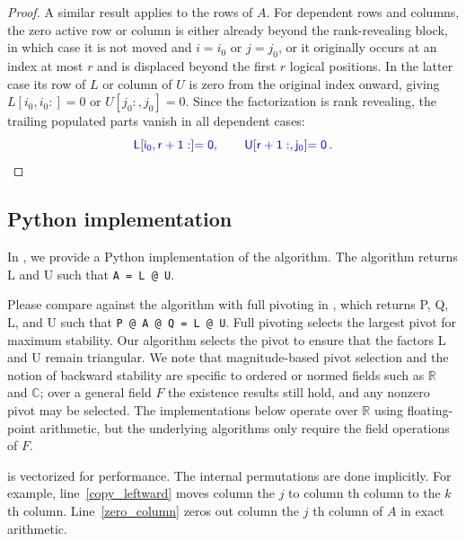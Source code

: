 \documentclass[10pt,twoside]{siamart1116}
\numberwithin{theorem}{section}
\providecommand{\DIFadd}[1]{{\protect\color{blue} \sf #1}} %
\providecommand{\DIFdel}[1]{{\protect\color{red} \scriptsize #1}} %
\providecommand{\DIFaddbegin}{} %
\providecommand{\DIFaddend}{} %
\providecommand{\DIFdelbegin}{} %
\providecommand{\DIFdelend}{} %
\begin{document}
\begin{proof}
  \DIFdelbegin \DIFdel{A similar result applies to the rows of $A$. }\DIFdelend \DIFaddbegin \DIFadd{For dependent rows and columns, the zero active row or column is either already beyond the rank-revealing block, in which case it is not moved and $i=i_0$ or $j=j_0$, or it originally occurs at an index at most $r$ and is displaced beyond the first $r$ logical positions. In the latter case its row of $L$ or column of $U$ is zero from the original index onward, giving $L[i_0,i_0:]=0$ or $U[j_0:,j_0]=0$. Since the factorization is rank revealing, the trailing populated parts vanish in all dependent cases:
  }\[
    \DIFadd{L}[\DIFadd{i_0,r+1:}] \DIFadd{= 0, \qquad U}[\DIFadd{r+1:,j_0}] \DIFadd{= 0 \,.
  }\]
\DIFaddend \end{proof}

\subsection{Python implementation}

In , we provide a Python implementation of the algorithm. The algorithm returns L and U such that \verb|A = L @ U|.

Please compare against the algorithm with full pivoting in , which returns P, Q, L, and U such that \verb|P @ A @ Q = L @ U|. Full pivoting selects the largest pivot for maximum stability. Our algorithm selects the pivot to ensure that the factors L and U remain triangular. \DIFaddbegin \DIFadd{We note that magnitude-based pivot selection and the notion of backward stability are specific to ordered or normed fields such as $\mathbb{R}$ and $\mathbb{C}$; over a general field $F$ the existence results still hold, and any nonzero pivot may be selected. The implementations below operate over $\mathbb{R}$ using floating-point arithmetic, but the underlying algorithms only require the field operations of $F$.
}\DIFaddend 

 is vectorized for performance. The internal permutations are done implicitly. For example, line~\ref{copy_leftward} moves \DIFdelbegin \DIFdel{column }\DIFdelend \DIFaddbegin \DIFadd{the }\DIFaddend $j$\DIFdelbegin \DIFdel{to column }\DIFdelend \DIFaddbegin \DIFadd{th column to the }\DIFaddend $k$\DIFaddbegin \DIFadd{th column}\DIFaddend . Line~\ref{zero_column} zeros out \DIFdelbegin \DIFdel{column }\DIFdelend \DIFaddbegin \DIFadd{the }\DIFaddend $j$\DIFaddbegin \DIFadd{th column }\DIFaddend of $A$ in exact arithmetic.
\end{document}
